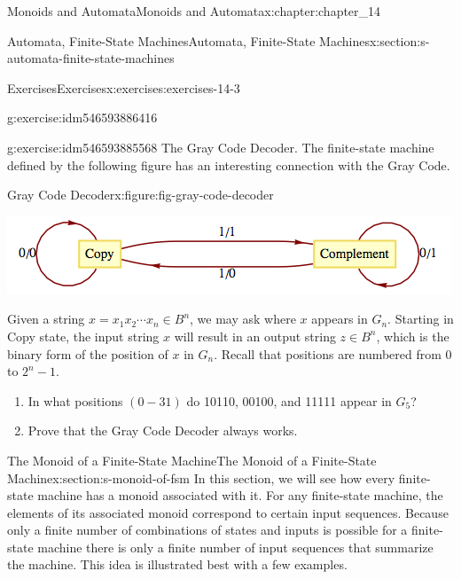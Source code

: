 \documentclass[oneside,10pt,]{book}
\numberwithin{equation}{section}
\begin{document}
\begin{chapterptx}{Monoids and Automata}{}{Monoids and Automata}{}{}{x:chapter:chapter_14}
\begin{sectionptx}{Automata, Finite-State Machines}{}{Automata, Finite-State Machines}{}{}{x:section:s-automata-finite-state-machines}
\begin{exercises-subsection}{Exercises}{}{Exercises}{}{}{x:exercises:exercises-14-3}
\begin{divisionexercise}{4}{}{}{g:exercise:idm546593886416}
\end{divisionexercise}%
\begin{divisionexercise}{5}{}{}{g:exercise:idm546593885568}%
The Gray Code Decoder. The finite-state machine defined by the following figure has an interesting connection with the Gray Code.%
\begin{figureptx}{Gray Code Decoder}{x:figure:fig-gray-code-decoder}{}%
\begin{image}{0.15}{0.7}{0.15}%
\includegraphics[width=\linewidth]{images/fig-gray-code-decoder.png}
\end{image}%
\tcblower
\end{figureptx}%
Given a string \(x=x_1x_2\cdots  x_n\in B^n\), we may ask where \(x\) appears in \(G_n\). Starting in Copy state, the input string \(x\) will result in an output string \(z\in B^n\), which is the binary form of the position of \(x\) in \(G_n\).  Recall that positions are numbered from 0 to \(2^n-1\).%
\begin{enumerate}[label=(\alph*)]
\item{}In what positions \((0-31)\) do 10110, 00100, and 11111 appear in \(G_5\)?%
\item{}Prove that the Gray Code Decoder always works.%
\end{enumerate}
%
\end{divisionexercise}%
\end{exercises-subsection}
\end{sectionptx}
%
%
\typeout{************************************************}
\typeout{************************************************}
%
\begin{sectionptx}{The Monoid of a Finite-State Machine}{}{The Monoid of a Finite-State Machine}{}{}{x:section:s-monoid-of-fsm}
%
In this section, we will see how every finite-state machine has a monoid associated with it. For any finite-state machine, the elements of its associated monoid correspond to certain input sequences. Because only a finite number of combinations of states and inputs is possible for a finite-state machine there is only a finite number of input sequences that summarize the machine. This idea is illustrated best with a few examples.%

\end{sectionptx}
\end{chapterptx}
\end{document}

